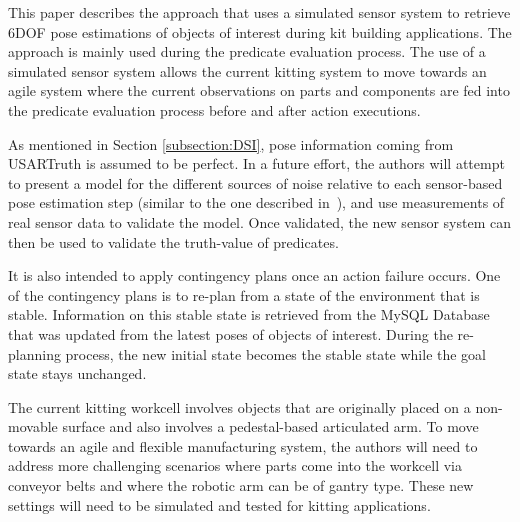 This paper describes the approach that uses a simulated sensor system to retrieve 6DOF pose estimations of objects of interest during kit building applications. The approach is mainly used during the predicate evaluation process. The use of a simulated sensor system allows the current kitting system to move towards an agile system where the current observations on parts and components are fed into the predicate evaluation process before and after action executions.

As mentioned in Section \ref{subsection:DSI}, pose information coming from USARTruth is assumed to be perfect. In a future effort, the authors will attempt to present a model for the different sources of noise relative to each sensor-based pose estimation step (similar to the one described in~\cite{Meeden.GPC.1998}), and use measurements of real sensor data to validate the model. Once validated, the new sensor system can then be used to validate the truth-value of predicates.

It is also intended to apply contingency plans once an action failure occurs. One of the contingency plans is to re-plan from a state of the environment that is stable. Information on this stable state is retrieved from the \textsf{MySQL Database} that was updated from the latest poses of objects of interest. During the re-planning process, the new initial state becomes the stable state while the goal state stays unchanged.

The current kitting workcell involves objects that are originally placed on a non-movable surface and also involves a pedestal-based articulated arm. To move towards an agile and flexible manufacturing system, the authors will need to address more challenging scenarios where parts come into the workcell via conveyor belts and where the robotic arm can be of gantry type. These new settings will need to be simulated and tested for kitting applications.




